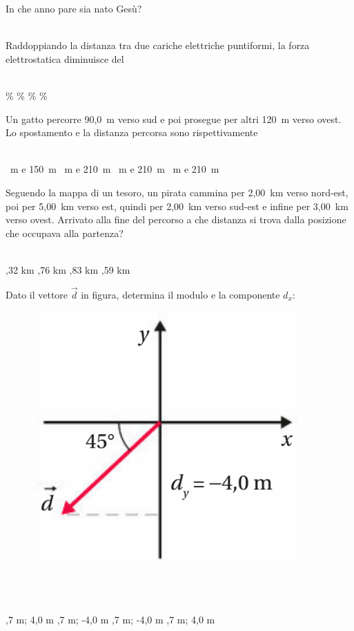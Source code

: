 \documentclass[a4paper,11pt]{exam}
\begin{document}
\begin{questions}

    
\question In che anno pare sia nato Gesù?\\\
\begin{oneparchoices}
\end{oneparchoices}

    
\question Raddoppiando la distanza tra due cariche elettriche puntiformi, la forza elettrostatica diminuisce del\\\
\begin{oneparchoices}
  \choice 90\%
  \%
  \%
  \%
\end{oneparchoices}

    
\question Un gatto percorre 90,0~m verso sud e poi prosegue per altri 120~m verso ovest. Lo spostamento e la distanza percorsa sono rispettivamente\\\
\begin{oneparchoices}
  ~m e 150~m
  \choice 150~m e 210~m
  \choice 210~m e 210~m
  \choice 30~m e 210~m
\end{oneparchoices}

    
\question Seguendo la mappa di un tesoro, un pirata cammina per 2,00~km verso nord-est, poi per 5,00~km verso est, quindi per 2,00~km verso sud-est e infine per 3,00~km verso ovest. Arrivato alla fine del percorso a che distanza si trova dalla posizione che occupava alla partenza?\\\
\begin{oneparchoices}
  ,32 km
  ,76 km
  \choice 4,83 km
  \choice 4,59 km
\end{oneparchoices}

    
\question Dato il vettore $\vec{d}$ in figura, determina il modulo e la componente $d_x$: \begin{figure}[h!]   \begin{center}     \includegraphics[scale=0.35]{vettored.png}   \end{center} \end{figure}\\\
\begin{oneparchoices}
  \choice -5,7 m; 4,0 m
  \choice -5,7 m; -4,0 m
  \choice 5,7 m; -4,0 m
  \choice 5,7 m; 4,0 m
\end{oneparchoices}


\end{questions}
\end{document}
